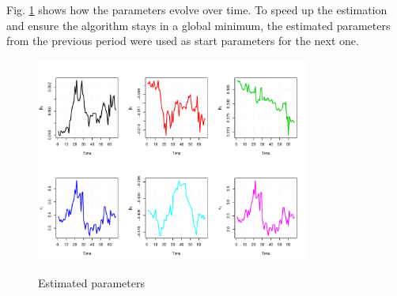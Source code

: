 Fig. \ref{fig:paramdevel} shows how the parameters evolve over time. To speed up the estimation and ensure the algorithm stays in a global minimum, the estimated parameters from the previous period were used as start parameters for the next one.

\begin{figure}[htb]
  \begin{center}
  \caption{Estimated parameters}
\includegraphics[width=0.8\textwidth]{paramdevel}
\label{fig:paramdevel}
\end{center}
\end{figure}



